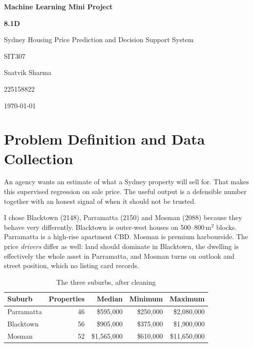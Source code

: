 \documentclass[12pt,a4paper]{article}
\newcommand{\assignmentName}{Machine Learning Mini Project}
\newcommand{\assignmentNumber}{8.1D}
\newcommand{\unitCode}{SIT307}
\newcommand{\studentName}{Saatvik Sharma}
\newcommand{\studentID}{225158822}
\begin{document}
\newcommand{\repoURL}{https://github.com/rxv801/sit307-8-1d-sydney-housing}

\begin{titlepage}
    \centering
    \vfill
    {\Huge \bfseries \color{appleblue} \assignmentName \par}
    \vspace{0.5cm}
    {\Huge \bfseries \color{appleblue} \assignmentNumber \par}
    \vspace{0.5cm}
    {\Large Sydney Housing Price Prediction and Decision Support System \par}
    \vspace{0.5cm}
    {\Large \unitCode \par}
    \vfill
    \vspace{3cm}
    {\large \studentName \par}
    {\large \studentID \par}
    {\large \today \par}
    \vfill
\end{titlepage}

\newpage
\tableofcontents
\newpage

\section{Problem Definition and Data Collection}

An agency wants an estimate of what a Sydney property will sell for. That makes this supervised
regression on sale price. The useful output is a defensible number together with an honest signal
of when it should not be trusted.

I chose Blacktown (2148), Parramatta (2150) and Mosman (2088) because they behave very
differently. Blacktown is outer-west houses on 500--800\,m$^2$ blocks. Parramatta is a high-rise
apartment CBD. Mosman is premium harbourside. The price \emph{drivers} differ as well: land
should dominate in Blacktown, the dwelling is effectively the whole asset in Parramatta, and
Mosman turns on outlook and street position, which no listing card records.

\begin{table}[H]
\centering
\caption{The three suburbs, after cleaning}
\label{tab:suburbs}
\begin{tabular}{lrrrr}
\toprule
Suburb & Properties & Median & Minimum & Maximum \\
\midrule
Parramatta & 46 & \$595,000 & \$250,000 & \$2,080,000 \\
Blacktown  & 56 & \$905,000 & \$375,000 & \$1,900,000 \\
Mosman     & 52 & \$1,565,000 & \$610,000 & \$11,650,000 \\
\bottomrule
\end{tabular}
\end{table}
\end{document}
